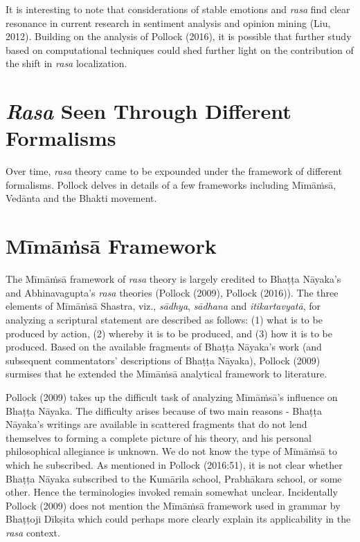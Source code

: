 It is interesting to note that considerations of stable emotions and \textsl{rasa} find clear resonance in current research in sentiment analysis and opinion mining (Liu, 2012). Building on the analysis of Pollock (2016), it is possible that further study based on computational techniques could shed further light on the contribution of the shift in \textsl{rasa} localization. 

\section*{\textsl{Rasa} Seen Through Different Formalisms}

Over time, \textsl{rasa} theory came to be expounded under the framework of different formalisms. Pollock delves in details of a few frameworks including Mīmāṁsā, Vedānta and the Bhakti movement. 

\section*{Mīmāṁsā Framework}

The Mīmāṁsā framework of \textsl{rasa} theory is largely credited to Bhaṭṭa Nāyaka’s and Abhinavagupta’s \textsl{rasa} theories (Pollock (2009), Pollock (2016)). The three elements of Mīmāṁsā Shastra, viz., \textsl{sādhya}, \textsl{sādhana} and \textsl{itikartavyatā}, for analyzing a scriptural statement are described as follows: (1) what is to be produced by action, (2) whereby it is to be produced, and (3) how it is to be produced. Based on the available fragments of Bhaṭṭa Nāyaka’s work (and subsequent commentators’ descriptions of Bhaṭṭa Nāyaka), Pollock (2009) surmises that he extended the Mīmāṁsā analytical framework to literature. 

Pollock (2009) takes up the difficult task of analyzing Mīmāṁsā’s influence on Bhaṭṭa Nāyaka. The difficulty arises because of two main reasons - Bhaṭṭa Nāyaka’s writings are available in scattered fragments that do not lend themselves to forming a complete picture of his theory, and his personal philosophical allegiance is unknown. We do not know the type of Mīmāṁsā to which he subscribed. As mentioned in Pollock (2016:51), it is not clear whether Bhaṭṭa Nāyaka subscribed to the Kumārila school, Prabhākara school, or some other. Hence the terminologies invoked remain somewhat unclear. Incidentally Pollock (2009) does not mention the Mīmāṁsā framework used in grammar by Bhaṭṭoji Dīkṣita which could perhaps more clearly explain its applicability in the \textsl{rasa} context. 

